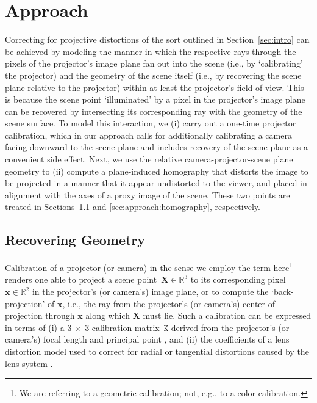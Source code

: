\documentclass[review]{elsarticle}
\begin{document}
\section{Approach}

Correcting for projective distortions of the sort outlined in Section~\ref{sec:intro} can be achieved by modeling the manner in which the respective rays through the pixels of the projector's image plane fan out into the scene (i.e., by `calibrating' the projector) and the geometry of the scene itself (i.e., by recovering the scene plane relative to the projector) within at least the projector's field of view. This is because the scene point `illuminated' by a pixel in the projector's image plane can be recovered by intersecting its corresponding ray with the geometry of the scene surface. To model this interaction, we (i) carry out a one-time projector calibration, which in our approach calls for additionally calibrating a camera facing downward to the scene plane and includes recovery of the scene plane as a convenient side effect. Next, we use the relative camera-projector-scene plane geometry to (ii) compute a plane-induced homography that distorts the image to be projected in a manner that it appear undistorted to the viewer, and placed in alignment with the axes of a proxy image of the scene. These two points are treated in Sections~\ref{sec:approach:geometry} and \ref{sec:approach:homography}, respectively.

\subsection{Recovering Geometry}\label{sec:approach:geometry}

Calibration of a projector (or camera) in the sense we employ the term here\footnote{We are referring to a geometric calibration; not, e.g., to a color calibration.} renders one able to project a scene point~$\mathbf{X} \in \mathbb{R}^3$ to its corresponding pixel~$\mathbf{x} \in \mathbb{R}^2$ in the projector's (or camera's) image plane, or to compute the `back-projection' of $\mathbf{x}$, i.e., the ray from the projector's (or camera's) center of projection through $\mathbf{x}$ along which $\mathbf{X}$ must lie. Such a calibration can be expressed in terms of (i) a $3~\times{}~3$ calibration matrix~$\mathtt{K}$ derived from the projector's (or camera's) focal length and principal point \cite{Hartley2004}, and (ii) the coefficients of a lens distortion model used to correct for radial or tangential distortions caused by the lens system \cite{duane1971close}.
\end{document}
